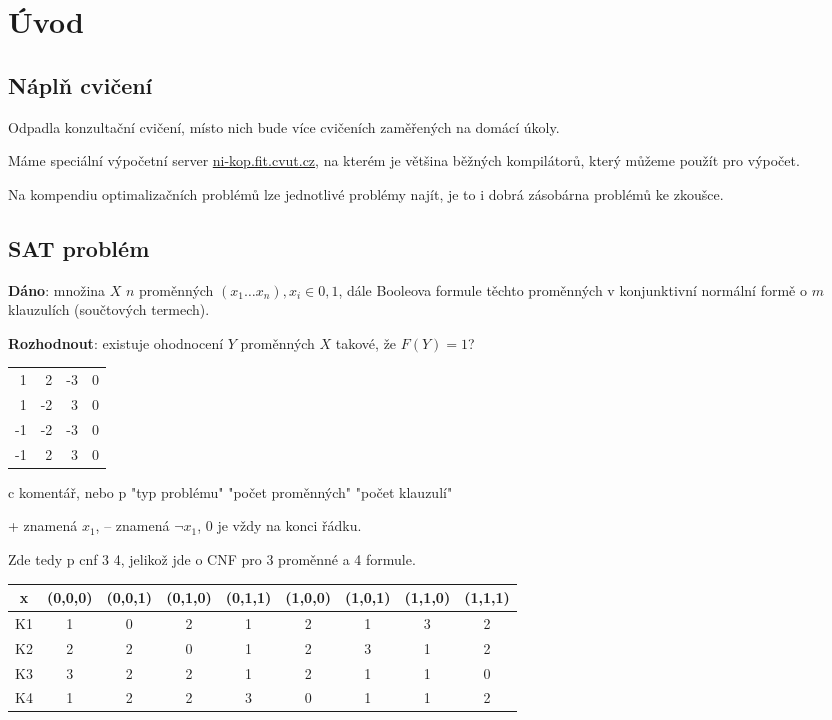 \section{Úvod}

\vspace{12pt}

\subsection{Náplň cvičení}

Odpadla konzultační cvičení, místo nich bude více cvičeních zaměřených na domácí úkoly.

Máme speciální výpočetní server \href{ssh://ni-kop.fit.cvut.cz}{ni-kop.fit.cvut.cz}, na kterém je většina běžných kompilátorů, který můžeme použít pro výpočet.

Na kompendiu optimalizačních problémů lze jednotlivé problémy najít, je to i dobrá zásobárna problémů ke zkoušce.

\subsection{SAT problém}

\textbf{Dáno}: množina $X$ $n$ proměnných $(x_1 \dots x_n), x_i \in {0,1}$, 
dále Booleova formule  těchto proměnných v konjunktivní normální formě o $m$ klauzulích (součtových termech).

\textbf{Rozhodnout}: existuje ohodnocení $Y$ proměnných $X$ takové, že $F(Y)=1$?

\begin{table}[H]
    \centering
    \begin{tabular}{r|r|r|r}
         1 & 2 & -3 & 0 \\
         1 & -2 & 3 & 0 \\
         -1 & -2 & -3 & 0 \\
         -1 & 2 & 3 & 0
    \end{tabular}
\end{table}

c komentář, nebo p "typ problému" "počet proměnných" "počet klauzulí"

+ znamená $x_1$, -- znamená $\neg x_1$, 0 je vždy na konci řádku.

Zde tedy \colorbox{gray!20}{p cnf 3 4}, jelikož jde o CNF pro 3 proměnné a 4 formule. 

\begin{table}[H]
    \centering
    \begin{tabular}{c|c|c|c|c|c|c|c|c}
           x & (0,0,0) & (0,0,1) & (0,1,0) & (0,1,1) & (1,0,0) & (1,0,1) & (1,1,0) & (1,1,1) \\
           \hline
          K1 & 1 & 0 & 2 & 1 & 2 & 1 & 3 & 2 \\
           \hline
          K2 & 2 & 2 & 0 & 1 & 2 & 3 & 1 & 2 \\
           \hline
          K3 & 3 & 2 & 2 & 1 & 2 & 1 & 1 & 0 \\
           \hline
          K4 & 1 & 2 & 2 & 3 & 0 & 1 & 1 & 2 \\
    \end{tabular}
\end{table}

